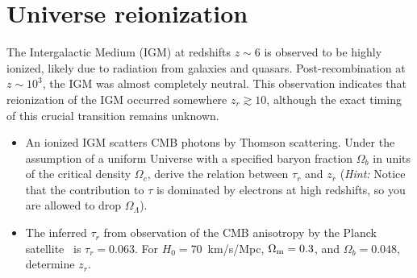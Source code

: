 \section{Universe reionization}

The Intergalactic Medium (IGM) at redshifts $z \sim 6$ is observed to be highly ionized, likely due to radiation from galaxies and quasars. Post-recombination at $z \sim 10^3$, the IGM was almost completely neutral. This observation indicates that reionization of the IGM occurred somewhere $z_r \gtrsim 10$, although the exact timing of this crucial transition remains unknown. 

\begin{itemize}
\item An ionized IGM scatters CMB photons by Thomson scattering. Under the assumption of a uniform Universe with a specified baryon fraction $\Omega_b$ in units of the critical density $\Omega_c$, derive the relation between $\tau_r$ and $z_r$ (\emph{Hint:} Notice that the contribution to $\tau$ is dominated by electrons at high redshifts, so you are allowed to drop $\Omega_\Lambda$).


\item The inferred $\tau_r$ from observation of the CMB anisotropy by the Planck satellite~\cite{} is $\tau_r = 0.063$. For $H_0 = 70$~km/s/Mpc, $\Omega_{\rm m} = 0.3$, and $\Omega_b = 0.048$, determine $z_r$.

\end{itemize}